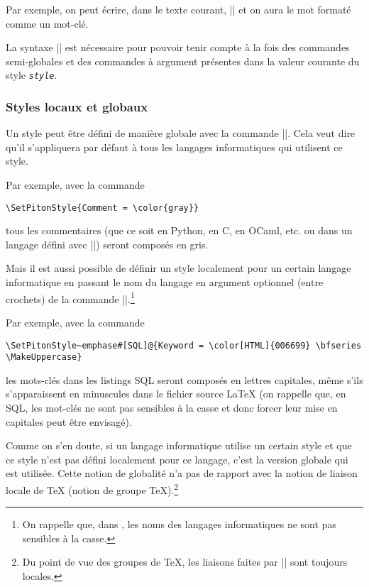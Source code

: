 \documentclass[dvipsnames,svgnames]{article}
\begin{document}
\smallskip
Par exemple, on peut écrire, dans le texte courant, |{}| et
on aura le mot {} formaté comme un mot-clé.

\smallskip
La syntaxe |{}| est nécessaire pour pouvoir
tenir compte à la fois des commandes semi-globales et des commandes à argument présentes
dans la valeur courante du style \texttt{\textsl{style}}.


\subsubsection{Styles locaux et globaux}

Un style peut être défini de manière globale avec la commande |\SetPitonStyle|. Cela veut
dire qu'il s'appliquera par défaut à tous les langages informatiques qui utilisent ce
style.

\medskip
Par exemple, avec la commande 
\begin{Verbatim}
\SetPitonStyle{Comment = \color{gray}}
\end{Verbatim}
tous les commentaires (que ce soit en Python, en C, en OCaml, etc. ou dans un langage
défini avec |\NewPitonLanguage|) seront composés en gris.

\bigskip
Mais il est aussi possible de définir un style localement pour un certain langage
informatique en passant le nom du langage en argument optionnel (entre crochets) de la
commande |\SetPitonStyle|.\footnote{On rappelle que, dans , les noms des
  langages informatiques ne sont pas sensibles à la casse.}

\medskip
Par exemple, avec la commande 
\begin{Verbatim}
\SetPitonStyle~emphase#[SQL]@{Keyword = \color[HTML]{006699} \bfseries \MakeUppercase}
\end{Verbatim}
les mots-clés dans les listings SQL seront composés en lettres capitales, même s'ils
s'apparaissent en minuscules dans le fichier source LaTeX (on rappelle que, en SQL, les
mot-clés ne sont pas sensibles à la casse et donc forcer leur mise en capitales peut être
envisagé).

\medskip
Comme on s'en doute, si un langage informatique utilise un certain style et que ce style
n'est pas défini localement pour ce langage, c'est la version globale qui est utilisée.
Cette notion de globalité n'a pas de rapport avec la notion de liaison locale de TeX
(notion de groupe TeX).\footnote{Du point de vue des groupes de TeX, les liaisons faites
  par |\SetPitonStyle| sont toujours locales.}
\end{document}
